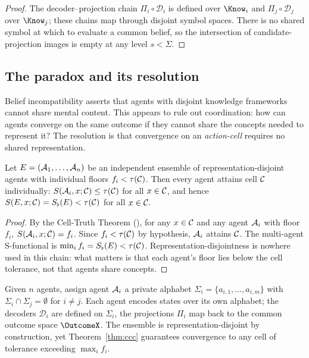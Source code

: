 \begin{proof}
The decoder--projection chain $\Pi_i\circ\mathcal{D}_i$ is defined over
$\Know_i$ and $\Pi_j\circ\mathcal{D}_j$ over $\Know_j$; these chains map
through disjoint symbol spaces. There is no shared symbol at which to
evaluate a common belief, so the intersection of candidate-projection images
is empty at any level $s<\Sigma$.
\end{proof}

\subsection{The paradox and its resolution}

Belief incompatibility asserts that agents with disjoint knowledge frameworks
cannot share mental content. This appears to rule out coordination: how can
agents converge on the same outcome if they cannot share the concepts needed
to represent it? The resolution is that convergence on an \emph{action-cell}
requires no shared representation.

\begin{theorem}\label{thm:ccc}
Let $E=(\mathcal{A}_1,\dots,\mathcal{A}_n)$ be an independent ensemble of
representation-disjoint agents with individual floors $f_i<\tau(\mathcal{C})$.
Then every agent attains cell $\mathcal{C}$ individually:
$S(\mathcal{A}_i,x;\mathcal{C})\le\tau(\mathcal{C})$ for all $x\in\mathcal{C}$, and hence
$S(E,x;\mathcal{C})=S_{\flat}(E)<\tau(\mathcal{C})$ for all $x\in\mathcal{C}$.
\end{theorem}

\begin{proof}
By the Cell-Truth Theorem (), for any $x\in\mathcal{C}$ and
any agent $\mathcal{A}_i$ with floor $f_i$, $S(\mathcal{A}_i,x;\mathcal{C})=f_i$. Since
$f_i<\tau(\mathcal{C})$ by hypothesis, $\mathcal{A}_i$ attains $\mathcal{C}$.
The multi-agent S-functional is $\min_i f_i=S_{\flat}(E)<\tau(\mathcal{C})$.
Representation-disjointness is nowhere used in this chain: what matters is
that each agent's floor lies below the cell tolerance, not that agents share
concepts.
\end{proof}

\begin{construction}\label{con:disjoint}
Given $n$ agents, assign agent $\mathcal{A}_i$ a private alphabet
$\Sigma_i=\{a_{i,1},\dots,a_{i,m}\}$ with $\Sigma_i\cap\Sigma_j=\emptyset$
for $i\ne j$. Each agent encodes states over its own alphabet; the decoders
$\mathcal{D}_i$ are defined on $\Sigma_i$, the projections $\Pi_i$ map back
to the common outcome space $\OutcomeX$. The ensemble is
representation-disjoint by construction, yet Theorem~\ref{thm:ccc} guarantees
convergence to any cell of tolerance exceeding $\max_i f_i$.
\end{construction}

